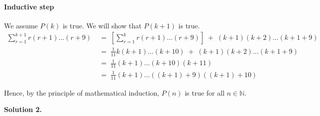\documentclass[10pt]{article}
\begin{document}
\begin{enumerate}
                \paragraph{Inductive step}
                We assume $P(k)$ is true. We will show that $P(k + 1)$ is true.
                \begin{align*}
                \sum_{r = 1}^{k + 1} r(r + 1)\dots(r + 9)
                                \;&=\; \left[\sum_{r = 1}^{k} r(r + 1)\dots(r + 9)\right] \;+\; (k + 1)(k + 2)\dots(k + 1 + 9) \\
                                \;&=\; \frac{1}{11}k(k + 1)\dots(k + 10) \;+\; (k + 1)(k + 2)\dots(k + 1 + 9) \tag{From $P(k)$}\\
                                \;&=\; \frac{1}{11}(k + 1)\dots(k + 10)(k + 11)\\
                                \;&=\; \frac{1}{11}(k + 1)\dots((k + 1) + 9)((k + 1) + 10)
                \end{align*}

                Hence, by the principle of mathematical induction, $P(n)$ is true for all $n \in \mathbb{N}$.
        \end{enumerate}
        \textbf{Solution 2.}\\ 
\end{document}
